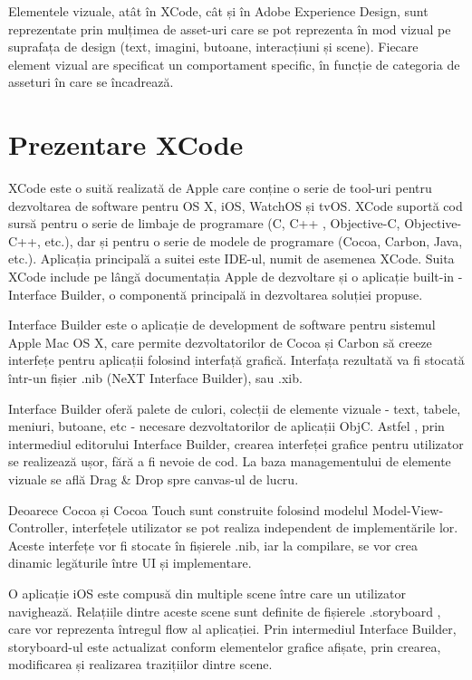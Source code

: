 Elementele vizuale, atât în XCode, cât și în Adobe Experience Design, sunt reprezentate prin mulțimea de asset-uri care se pot reprezenta în mod vizual pe suprafața de design (text, imagini, butoane, interacțiuni și scene). Fiecare element vizual are specificat un comportament specific, în funcție de categoria de asseturi în care se încadrează.

\section{Prezentare XCode}

XCode este o suită realizată de Apple care conține o serie de tool-uri pentru dezvoltarea de software pentru OS X, iOS, WatchOS și tvOS. \cite{Aboutxcode} XCode suportă cod sursă pentru o serie de limbaje de programare (C, C++ , Objective-C, Objective-C++, etc.), dar și pentru o serie de modele de programare (Cocoa, Carbon, Java, etc.). Aplicația principală a suitei este IDE-ul, numit de asemenea XCode. Suita XCode include pe lângă documentația Apple de dezvoltare și o aplicație built-in - Interface Builder, o componentă principală in dezvoltarea soluției propuse.

Interface Builder este o aplicație de development de software pentru sistemul Apple Mac OS X, care permite dezvoltatorilor de Cocoa și Carbon să creeze interfețe pentru aplicații folosind interfață grafică. Interfața rezultată va fi stocată într-un fișier .nib (NeXT Interface Builder), sau .xib.

Interface Builder oferă palete de culori, colecții de elemente vizuale - text, tabele, meniuri, butoane, etc - necesare dezvoltatorilor de aplicații ObjC. Astfel , prin intermediul editorului Interface Builder, crearea interfeței grafice pentru utilizator se realizează ușor, fără a fi nevoie de cod. La baza managementului de elemente vizuale se află Drag & Drop spre canvas-ul de lucru. 

Deoarece Cocoa și Cocoa Touch sunt construite folosind modelul Model-View-Controller, interfețele utilizator se pot realiza independent de implementările lor. Aceste interfețe vor fi stocate în fișierele .nib, iar la compilare, se vor crea dinamic legăturile între UI și implementare.

O aplicație iOS este compusă din multiple scene între care un utilizator navighează. Relațiile dintre aceste scene sunt definite de fișierele .storyboard \cite{StructuraXcode}, care vor reprezenta întregul flow al aplicației. Prin intermediul Interface Builder, storyboard-ul este actualizat conform elementelor grafice afișate, prin crearea, modificarea și realizarea trazițiilor dintre scene.

